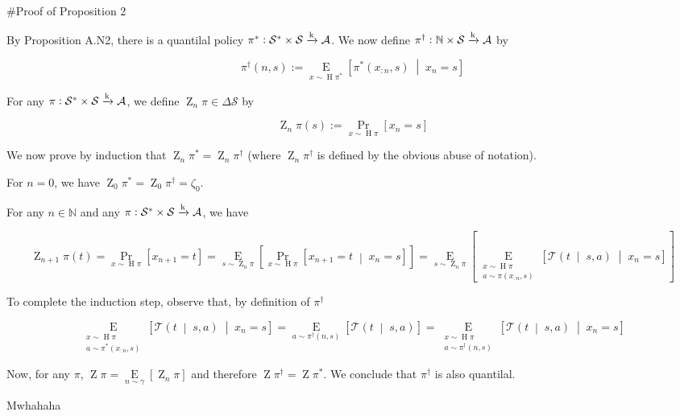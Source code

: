 \documentclass[a4paper]{article}
\newcommand{\AP}[1]{\left(#1\right)}
\newcommand{\AB}[1]{\left[#1\right]}
\newcommand{\APM}[2]{\left(#1\;\middle\vert\;#2\right)}
\newcommand{\ABM}[2]{\left[#1\;\middle\vert\;#2\right]}
\newcommand{\Pa}[2]{\underset{#1}{\operatorname{Pr}}\AB{#2}}
\newcommand{\CP}[3]{\underset{#1}{\operatorname{Pr}}\ABM{#2}{#3}}
\newcommand{\Ea}[2]{\underset{#1}{\operatorname{E}}\AB{#2}}
\newcommand{\CE}[3]{\underset{#1}{\operatorname{E}}\ABM{#2}{#3}}
\newcommand{\Nats}{\mathbb{N}}
\newcommand{\K}{\xrightarrow{\textnormal{k}}}
\newcommand{\A}{\mathcal{A}}
\newcommand{\St}{\mathcal{S}}
\newcommand{\T}{\mathcal{T}}
\DeclareMathOperator{\Hi}{H}
\DeclareMathOperator{\Z}{Z}
\begin{document}
\#Proof of Proposition 2

By Proposition A.N2, there is a quantilal policy $\pi^*: \St^* \times \St \K \A$. We now define $\pi^\dagger: \Nats \times \St \K \A$ by

$$\pi^\dagger(n,s):=\CE{x\sim\Hi{\pi^*}}{\pi^*(x_{:n},s)}{x_n=s}$$

For any $\pi: \St^* \times \St \K \A$, we define $\Z_n{\pi} \in \Delta\St$ by

$$\Z_n{\pi}(s) := \Pa{x\sim\Hi{\pi}}{x_n=s}$$

We now prove by induction that $\Z_n{\pi^*} = \Z_n{\pi^\dagger}$ (where $\Z_n{\pi^\dagger}$ is defined by the obvious abuse of notation).

For $n=0$, we have $\Z_0{\pi^*} = \Z_0{\pi^\dagger} = \zeta_0$.

For any $n \in \Nats$ and any $\pi: \St^* \times \St \K \A$, we have

$$\Z_{n+1}{\pi}(t) = \Pa{x\sim\Hi{\pi}}{x_{n+1}=t} = \Ea{s\sim\Z_n{\pi}}{\CP{x\sim\Hi{\pi}}{x_{n+1} = t}{x_n=s}} = \Ea{s\sim\Z_n{\pi}}{\CE{\substack{x\sim\Hi{\pi} \\ a\sim\pi\AP{x_{:n},s}}}{\T\APM{t}{s,a}}{x_n=s}}$$

To complete the induction step, observe that, by definition of $\pi^\dagger$


$$\CE{\substack{x\sim\Hi{\pi} \\ a\sim\pi^*\AP{x_{:n},s}}}{\T\APM{t}{s,a}}{x_n=s} = \Ea{a\sim\pi^\dagger\AP{n,s}}{\T\APM{t}{s,a}}=\CE{\substack{x\sim\Hi{\pi} \\ a\sim\pi^\dagger\AP{n,s}}}{\T\APM{t}{s,a}}{x_n=s}$$

Now, for any $\pi$, $\Z{\pi}=\Ea{n\sim\gamma}{\Z_n{\pi}}$ and therefore $\Z{\pi^\dagger} = \Z{\pi^*}$. We conclude that $\pi^\dagger$ is also quantilal.

Mwhahaha
\end{document}
